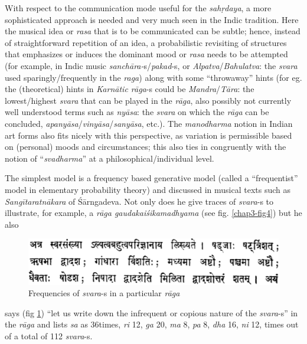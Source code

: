 With respect to the communication mode useful for the \textsl{sahṛdaya}, a more sophisticated approach is needed and very much seen in the Indic tradition. Here the musical idea or \textsl{rasa} that is to be communicated can be subtle; hence, instead of straightforward repetition of an idea, a probabilistic revisiting of structures that emphasizes or induces the dominant mood or \textsl{rasa} needs to be attempted (for example, in Indic music \textsl{sanchāra-}s/\textsl{pakad}-s, or \textsl{Alpatva}/\textsl{Bahulatva}: the \textsl{svara} used sparingly/frequently in the \textsl{raga}) along with some “throwaway” hints (for eg. the (theoretical) hints in \textsl{Karnātic rāga}-s could be \textsl{Mandra}/\textsl{Tāra}: the lowest/highest \textsl{svara} that can be played in the \textsl{rāga}, also possibly not currently well understood terms such as \textsl{nyāsa}: the \textsl{svara} on which the \textsl{rāga} can be concluded, \textsl{apanyāsa}/\textsl{vinyāsa}/\textsl{sanyāsa}, etc.). The \textsl{manodharma} notion in Indian art forms also fits nicely with this perspective, as variation is permissible based on (personal) moods and circumstances; this also ties in congruently with the notion of “\textsl{svadharma}” at a philosophical/individual level.

The simplest model is a frequency based generative model (called a “frequentist” model in elementary probability theory) and discussed in musical texts such as \textsl{Sangītaratnākara} of Śārngadeva. Not only does he give traces of \textsl{svara}-s to illustrate, for example, a \textsl{rāga gaudakaiśikamadhyama} (see fig. \ref{chap3-fig4}) but he also 
\begin{figure}[H]
\centering
\includegraphics[scale=.32]{figures/5.eps}
\caption{Frequencies of \textsl{svara}-s in a particular \textsl{rāga}}\label{chap3-fig3}
\end{figure}
says (fig \ref{chap3-fig3}) “let us write down the infrequent or copious nature of the \textsl{svara}-s” in the \textsl{rāga} and lists \textsl{sa} as 36times, \textsl{ri} 12, \textsl{ga} 20, \textsl{ma} 8, \textsl{pa} 8, \textsl{dha} 16, \textsl{ni} 12, times out of a total of 112 \textsl{svara}-s. 

